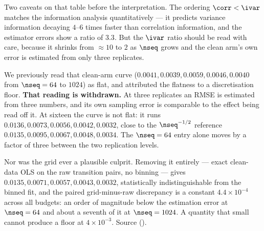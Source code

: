 \documentclass{article}
\begin{document}
Two caveats on that table before the interpretation. The ordering $\corr < \ivar$ matches the
information analysis quantitatively --- it predicts variance information decaying $4$--$6$ times
faster than correlation information, and the estimator errors show a ratio of $3.3$. But the
$\ivar$ ratio should be read with care, because it shrinks from ${\approx}10$ to $2$ as $\nseq$
grows and the clean arm's own error is estimated from only three replicates.

We previously read that clean-arm curve ($0.0041,0.0039,0.0059,0.0046,0.0040$ from $\nseq=64$
to $1024$) as flat, and attributed the flatness to a discretisation floor. \textbf{That reading
is withdrawn.} At three replicates an RMSE is estimated from three numbers, and its own sampling
error is comparable to the effect being read off it. At sixteen the curve is not flat: it runs
$0.0136, 0.0073, 0.0056, 0.0042, 0.0032$, close to the $\nseq^{-1/2}$ reference
$0.0135, 0.0095, 0.0067, 0.0048, 0.0034$. The $\nseq=64$ entry alone moves by a factor of three
between the two replication levels.

Nor was the grid ever a plausible culprit. Removing it entirely --- exact clean-data OLS on the
raw transition pairs, no binning --- gives $0.0135, 0.0071, 0.0057, 0.0043, 0.0032$, statistically
indistinguishable from the binned fit, and the paired grid-minus-raw discrepancy is a constant
$4.4\times10^{-4}$ across all budgets: an order of magnitude below the estimation error at
$\nseq=64$ and about a seventh of it at $\nseq=1024$. A quantity that small cannot produce a
floor at $4\times10^{-3}$. Source 
().
\end{document}
